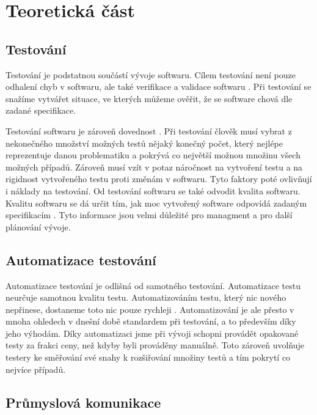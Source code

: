 \chapter{Teoretická část} %

\section{Testování}

Testování je podstatnou součástí vývoje softwaru. Cílem testování není pouze odhalení chyb v softwaru, ale také verifikace a validace softwaru \cite{singh2012software}. Při testování se snažíme vytvářet situace, ve kterých můžeme ověřit, že se software chová dle zadané specifikace.

Testování softwaru je zároveň dovednost \cite{fewster1999software}. Při testování člověk musí vybrat z nekonečného množství možných testů nějaký konečný počet, který nejlépe reprezentuje danou problematiku a pokrývá co největší možnou množinu všech možných případů. Zároveň musí vzít v potaz náročnost na vytvoření testu a na rigidnost vytvořeného testu proti změnám v softwaru. Tyto faktory poté ovlivňují i náklady na testování. Od testování softwaru se také odvodit kvalita softwaru. Kvalitu softwaru se dá určit tím, jak moc vytvořený software odpovídá zadaným specifikacím \cite{software_quality}. Tyto informace jsou velmi důležité pro managment a pro další plánování vývoje. 


\section{Automatizace testování}

Automatizace testování je odlišná od samotného testování. Automatizace testu neurčuje samotnou kvalitu testu. Automatizováním testu, který nic nového nepřinese, dostaneme toto nic pouze rychleji \cite{fewster1999software}. Automatizování je ale přesto v mnoha ohledech v dnešní době standardem při testování, a to především díky jeho výhodám. Díky automatizaci jsme při vývoji schopni provádět opakované testy za frakci ceny, než kdyby byli prováděny manuálně. Toto zároveň uvolňuje testery ke směřování své snahy k rozšiřování množiny testů a tím pokrytí co nejvíce případů.


\section{Průmyslová komunikace}


